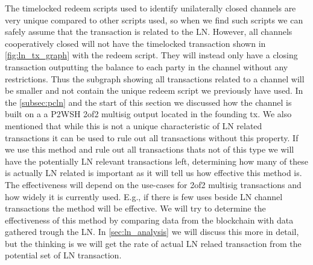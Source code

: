 The timelocked redeem scripts used to identify unilaterally closed channels are very unique compared to other scripts used, so when we find such scripts we can safely assume that the transaction is related to the LN. However, all channels cooperatively closed will not have the timelocked transaction shown in \cref{fig:ln_tx_graph} with the redeem script. They will instead only have a closing transaction outputting the balance to each party in the channel without any restrictions. Thus the subgraph showing all transactions related to a channel will be smaller and not contain the unique redeem script we previously have used. In the \cref{subsec:pcln} and the start of this section we discussed how the channel is built on a a P2WSH 2of2 multisig output located in the founding tx. We also mentioned that while this is not a unique characteristic of LN related transactions it can be used to rule out all transactions without this property.
If we use this method and rule out all transactions thats not of this type we will have the potentially LN relevant transactions left, determining how many of these is actually LN related is important as it will tell us how effective this method is. The effectiveness will depend on the use-cases for 2of2 multisig transactions and how widely it is currently used. E.g., if there is few uses beside LN channel transactions the method will be effective. We will try to determine the effectiveness of this method by comparing data from the blockchain with data gathered trough the LN. In \cref{sec:ln_analysis} we will discuss this more in detail, but the thinking is we will get the rate of actual LN relaed transaction from the potential set of LN transaction. 
\\

